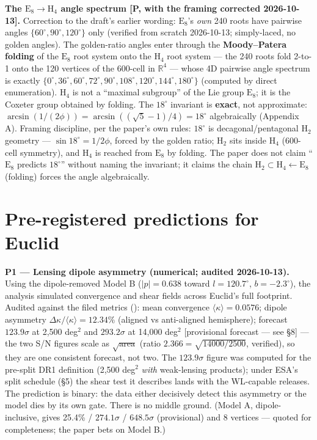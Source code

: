 \documentclass{alienfolio}
\begin{document}
\textbf{The $\mathrm{E}_8\to\mathrm{H}_4$ angle spectrum [P, with the
framing corrected 2026-10-13].} Correction to the draft's earlier
wording: $\mathrm{E}_8$'s \emph{own} 240 roots have pairwise angles
$\{60^\circ, 90^\circ, 120^\circ\}$ only (verified from scratch
2026-10-13; simply-laced, no golden angles). The golden-ratio angles
enter through the \textbf{Moody--Patera folding} of the $\mathrm{E}_8$
root system onto the $\mathrm{H}_4$ root system --- the 240 roots fold
2-to-1 onto the 120 vertices of the 600-cell in $\mathbb{R}^4$ --- whose
4D pairwise angle spectrum is exactly $\{0^\circ, 36^\circ, 60^\circ,
72^\circ, 90^\circ, 108^\circ, 120^\circ, 144^\circ, 180^\circ\}$ (computed by direct enumeration). $\mathrm{H}_4$ is not
a ``maximal subgroup'' of the Lie group $\mathrm{E}_8$; it is the Coxeter
group obtained by folding. The $18^\circ$ invariant is \textbf{exact},
not approximate: $\arcsin(1/(2\phi)) = \arcsin((\sqrt{5}-1)/4) = 18^\circ$
algebraically (Appendix A). Framing discipline, per the paper's own
rules: $18^\circ$ is decagonal/pentagonal \textbf{$\mathrm{H}_2$}
geometry --- $\sin 18^\circ = 1/2\phi$, forced by the golden ratio;
$\mathrm{H}_2$ sits inside $\mathrm{H}_4$ (600-cell symmetry), and
$\mathrm{H}_4$ is reached from $\mathrm{E}_8$ by folding. The paper does
not claim ``$\mathrm{E}_8$ predicts $18^\circ$'' without naming the
invariant; it claims the chain $\mathrm{H}_2 \subset \mathrm{H}_4
\leftarrow \mathrm{E}_8$ (folding) forces the angle algebraically.

\section{Pre-registered predictions for Euclid}
\label{sec:predictions}

{\sloppy
\textbf{P1 --- Lensing dipole asymmetry (numerical; audited 2026-10-13).} Using
the dipole-removed Model B ($|p| = 0.638$ toward $l = 120.7^\circ$, $b =
-2.3^\circ$), the analysis simulated convergence and shear fields across
Euclid's full footprint. Audited against the filed metrics
({\small{}}):
mean convergence $\langle\kappa\rangle = 0.0576$; dipole asymmetry
$\Delta\kappa/\langle\kappa\rangle = 12.34\%$ (aligned vs anti-aligned
hemisphere); forecast $123.9\sigma$ at 2,500 deg$^2$ and $293.2\sigma$ at
14,000 deg$^2$ [provisional forecast --- see \S8] --- the two S/N figures
scale as $\sqrt{\mathrm{area}}$ (ratio $2.366 = \sqrt{14000/2500}$,
verified), so they are one consistent forecast, not two. The $123.9\sigma$
figure was computed for the pre-split DR1 definition (2,500 deg$^2$
\emph{with} weak-lensing products); under ESA's split schedule (\S5) the
shear test it describes lands with the WL-capable releases. The prediction
is binary: the data either decisively detect this asymmetry or the model
dies by its own gate. There is no middle ground. (Model A,
dipole-inclusive, gives 25.4\% / $274.1\sigma$ / $648.5\sigma$
(provisional) and 8 vertices --- quoted for completeness; the
paper bets on Model B.)
\par}
\end{document}
